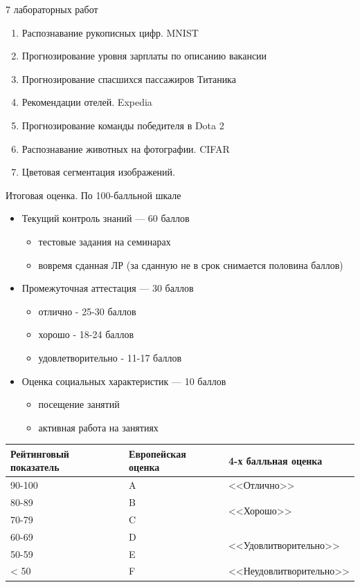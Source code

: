\documentclass{beamer}
\begin{document}
\begin{frame}{7 лабораторных работ}
    \begin{enumerate}
        \item Распознавание рукописных цифр. MNIST
        \item Прогнозирование уровня зарплаты по описанию вакансии
        \item Прогнозирование спасшихся пассажиров Титаника
        \item Рекомендации отелей. Expedia
        \item Прогнозирование команды победителя в Dota 2
        \item Распознавание животных на фотографии. CIFAR
        \item Цветовая сегментация изображений.
    \end{enumerate}
\end{frame}

\begin{frame}{Итоговая оценка. По 100-балльной шкале}
    \begin{itemize}
        \item Текущий контроль знаний --- 60 баллов
        \begin{itemize}
            \item тестовые задания на семинарах
            \item вовремя сданная ЛР (за сданную не в срок снимается половина баллов)
        \end{itemize}
        \item Промежуточная аттестация --- 30 баллов
        \begin{itemize}
            \item отлично - 25-30 баллов
            \item хорошо - 18-24 баллов
            \item удовлетворительно - 11-17 баллов
        \end{itemize}
        \item Оценка социальных характеристик --- 10 баллов
        \begin{itemize}
            \item посещение занятий
            \item активная работа на занятиях
        \end{itemize}
    \end{itemize}
    \small
    \begin{tabular}{|p{}|p{}|p{}|}
    \hline
    Рейтинговый показатель & Европейская оценка & 4-х балльная оценка \\
    \hline
    90-100 & A & <<Отлично>>\\
    \hline
    80-89 & B & \multirow{2}{*}{<<Хорошо>>}\\
    70-79 & C & \\
    \hline
    60-69 & D & \multirow{2}{*}{<<Удовлитворительно>>}\\
    50-59 & E & \\
    \hline
    < 50 & F & <<Неудовлитворительно>>\\
    \hline
    \end{tabular}
\end{frame}
\end{document}
